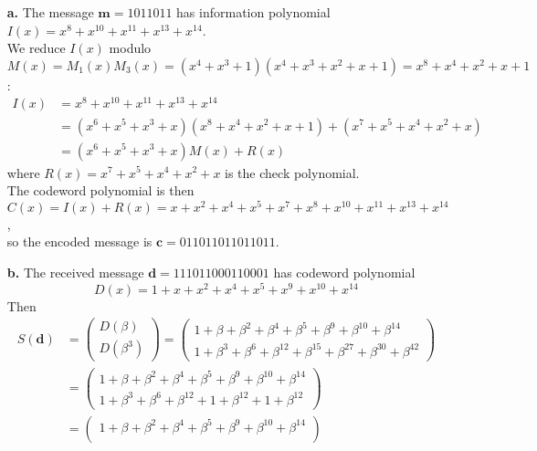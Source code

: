 \documentclass[11pt]{article}
\renewcommand{\vec}[1]{\mathbf{#1}}
\newcommand{\vc}[1]{\begin{pmatrix}#1\end{pmatrix}}
\begin{document}
\begin{itemize}
      \item[{\bf a.}]  The message $\vec{m} = \text{1011011}$ has
                  information polynomial $I(x) = x^8 + x^{10} + x^{11} + x^{13} + x^{14}$.\\
                  We reduce $I(x)$ modulo
                  $M(x) = M_1(x)M_3(x) = (x^4+x^3+1)(x^4+x^3+x^2+x+1) = x^8 + x^4 + x^2 + x + 1$:
                   \begin{align*}
                     I(x) &=  x^8 + x^{10} + x^{11} + x^{13} + x^{14}\\
                          &= (x^6+x^5+x^3+x)(x^8 + x^4 + x^2 + x + 1) + (x^7+x^5+x^4+x^2+x)\\
                          &= (x^6+x^5+x^3+x) M(x) + R(x)
                   \end{align*}
                   where $R(x) = x^7+x^5+x^4+x^2+x$ is the check polynomial.\\
                   The codeword polynomial is then
                   $C(x) = I(x) + R(x) = x + x^2 + x^4 + x^5 + x^7 + x^8 + x^{10} + x^{11} + x^{13} + x^{14}$,\\
                   so the encoded message is $\vec{c} = \text{011011011011011}$.
      \item[{\bf b.}]    The received message    $\vec{d} = \text{111011000110001}$
                   has codeword polynomial
                   \[
                     D(x) = 1 + x + x^2 + x^4 + x^5 + x^9 + x^{10} + x^{14}
                   \]
                   Then
                   \begin{align*}
                     S(\vec{d})&= \vc{D(\beta)\\
                                      D(\beta^3)}
                                = \vc{1 + \beta   + \beta^2 + \beta^4    + \beta^5    + \beta^9    + \beta^{10} + \beta^{14} \\
                                      1 + \beta^3 + \beta^6 + \beta^{12} + \beta^{15} + \beta^{27} + \beta^{30} + \beta^{42}}\\
                               &= \vc{1 + \beta   + \beta^2 + \beta^4    + \beta^5    + \beta^9    + \beta^{10} + \beta^{14} \\
                                      1 + \beta^3 + \beta^6 + \beta^{12} +    1       + \beta^{12} +    1       + \beta^{12}}\\
                               &= \vc{1 + \beta   + \beta^2 + \beta^4    + \beta^5    + \beta^9    + \beta^{10} + \beta^{14} \\
}
\end{align*}
\end{itemize}
\end{document}

